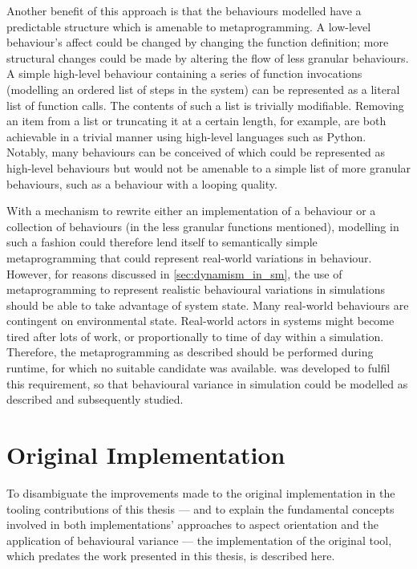Another benefit of this approach is that the behaviours modelled have a
predictable structure which is amenable to metaprogramming. A low-level
behaviour's affect could be changed by changing the function definition; more
structural changes could be made by altering the flow of less granular
behaviours. A simple high-level behaviour containing a series of function
invocations (modelling an ordered list of steps in the \sociotechnical system)
can be represented as a literal list of function calls. The contents of such a
list is trivially modifiable. Removing an item from a list or truncating it at a
certain length, for example, are both achievable in a trivial manner using
high-level languages such as Python. Notably, many behaviours can be conceived
of which could be represented as high-level behaviours but would not be amenable
to a simple list of more granular behaviours, such as a behaviour with a looping
quality. 

With a mechanism to rewrite either an implementation of a behaviour or a
collection of behaviours (in the less granular functions mentioned), modelling
in such a fashion could therefore lend itself to semantically simple
metaprogramming that could represent real-world variations in behaviour.
However, for reasons discussed in \cref{sec:dynamism_in_sm},
the use of metaprogramming to represent realistic behavioural variations in
\sociotechnical simulations should be able to take advantage of system state.
Many real-world behaviours are contingent on environmental state. Real-world
actors in \sociotechnical systems might become tired after lots of work, or
proportionally to time of day within a simulation. Therefore, the
metaprogramming as described should be performed during runtime, for which no
suitable candidate was available. \pdsf{} was developed to fulfil this
requirement, so that behavioural variance in \sociotechnical simulation could be
modelled as described and subsequently studied.



\section{Original \pdsf Implementation}\label{sec:prior_work_pdsf}

To disambiguate the improvements made to the original \pdsf implementation
in the tooling contributions of this thesis --- and to explain the fundamental
concepts involved in both implementations' approaches to aspect orientation and
the application of behavioural variance --- the implementation of the original
\pdsf tool, which predates the work presented in this thesis, is described here.



